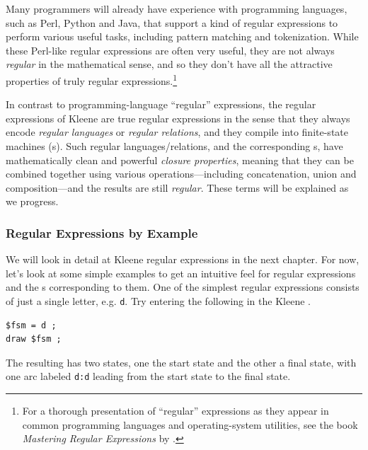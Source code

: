 Many programmers will already have experience with programming languages, such as Perl,
Python and Java, that support a kind of regular expressions to
perform various useful tasks, including pattern matching and tokenization.  While these
Perl-like regular expressions are often very useful, they are not always \emph{regular}
in the mathematical sense, and so they don't have all the attractive properties of truly
regular expressions.\footnote{For a thorough presentation of ``regular'' expressions as
they appear in common programming languages and operating-system utilities, see the book \emph{Mastering Regular Expressions} by
\citet{friedl:2006}.}

In contrast to programming-language ``regular'' expressions, the regular expressions of Kleene are true regular
expressions in the sense that they always
encode \emph{regular languages} or \emph{regular relations}, and they compile into
finite-state machines (\fsm{}s).  Such regular languages/relations, and the
corresponding \fsm{}s, have mathematically clean and powerful \emph{closure properties}, meaning
that they can be combined together using various operations---including concatenation,
union and composition---and the results are still \emph{regular}.  These terms will be explained as we progress.


\subsubsection{Regular Expressions by Example}

We will look in detail at Kleene regular expressions in the next chapter.  
For now, let's look at some simple examples to get an
intuitive feel for regular expressions and the \fsm{}s corresponding to them.  One of the simplest regular
expressions consists of just a single letter, e.g. \texttt{d}.  Try entering the
following in the Kleene .

\begin{Verbatim}
$fsm = d ;
draw $fsm ;
\end{Verbatim}

\noindent
The resulting \fsm{} has two states, one the start state and the other a final state,
with one arc labeled \texttt{d:d} leading from the start state to the final state.  


